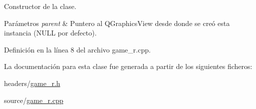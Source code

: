 Constructor de la clase. 


\begin{DoxyParams}{Parámetros}
{\em parent} & Puntero al Q\-Graphics\-View desde donde se creó esta instancia (N\-U\-L\-L por defecto). \\
\hline
\end{DoxyParams}


Definición en la línea 8 del archivo game\-\_\-r.\-cpp.



La documentación para esta clase fue generada a partir de los siguientes ficheros\-:\begin{DoxyCompactItemize}
\item 
headers/\hyperlink{game__r_8h}{game\-\_\-r.\-h}\item 
source/\hyperlink{game__r_8cpp}{game\-\_\-r.\-cpp}\end{DoxyCompactItemize}
